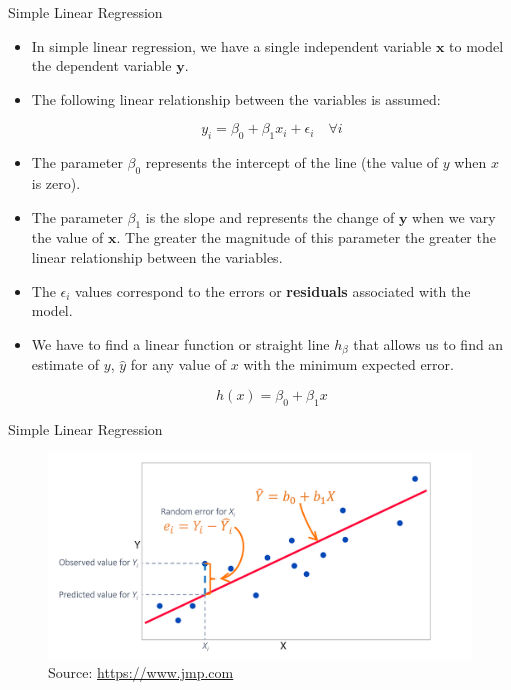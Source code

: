 \documentclass[handout]{beamer}
\begin{document}
\begin{frame}{Simple Linear Regression}
\scriptsize{
\begin{itemize}
 \item In simple linear regression, we have a single independent variable $\mathbf{x}$ to model the dependent variable $\mathbf{y}$.

 \item The following linear relationship between the variables is assumed:

\begin{displaymath}
 y_i=\beta_{0}+\beta_{1}x_i +\epsilon_i \quad \forall i
\end{displaymath}

\item The parameter $\beta_{0}$ represents the intercept of the line (the value of $y$ when $x$ is zero).  

\item The parameter $\beta_{1}$ is the slope and represents the change of $\mathbf{y}$ when we vary the value of $\mathbf{x}$. The greater the magnitude of this parameter the greater the linear relationship between the variables.

\item The $\epsilon_{i}$ values correspond to the errors or \textbf{residuals} associated with the model.

\item We have to find a linear function or straight line $h_\beta$ that allows us to find an estimate of $y$, $\hat{y}$ for any value of $x$ with the minimum expected error.

\begin{displaymath}
h(x)=\beta_{0}+\beta_{1}x 
\end{displaymath}


\end{itemize}


} 
 
\end{frame}



\begin{frame}{Simple Linear Regression}
\scriptsize{

\begin{figure}[h!]
	\centering
	\includegraphics[scale=0.21]{pics/linear_model.png}
	\caption{Source: \url{https://www.jmp.com}}
\end{figure}

} 
 
\end{frame}
\end{document}
